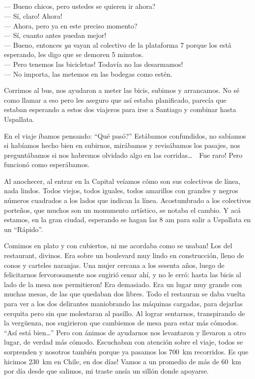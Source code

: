 \subparagraph{}\label{ssub:Valparaiso} --- Bueno chicos, \textquestiondown pero
ustedes se quieren ir ahora? \\ --- \textexclamdown S\'i, claro! \textexclamdown
Ahora! \\ --- \textquestiondown Ahora, pero ya en este preciso momento? \\ ---
\textexclamdown S\'i, cuanto antes puedan mejor! \\ --- Bueno, entonces
\emph{ya} vayan al colectivo de la plataforma 7 porque los est\'a esperando, les
digo que se demoren 5 minutos. \\ --- \textexclamdown Pero tenemos las
bicicletas! \textexclamdown Todav\'ia no las desarmamos! \\ --- No importa, las
metemos en las bodegas como est\'en.\\ \hangindent=1cm

Corrimos al bus, nos ayudaron a meter las bicis, subimos y arrancamos. No s\'e
como llamar a eso pero les aseguro que as\'i estaba planificado, parec\'ia que
estaban esperando a estos dos viajeros para irse a Santiago y combinar hasta
Uspallata.

En el viaje \'ibamos pensando: ``\textquestiondown Qu\'e pas\'o?'' Est\'abamos
confundidos, no sab\'iamos si hab\'iamos hecho bien en subirnos, mir\'abamos y
revis\'abamos los pasajes, nos pregunt\'abamos si nos habremos olvidado algo
en las corridas\ldots\ \ \textexclamdown Fue raro! Pero funcion\'o como
esper\'abamos.

Al anochecer, al entrar en la Capital ve\'iamos c\'omo son sus colectivos de
l\'inea, nada lindos. Todos viejos, todos iguales, todos amarillos con grandes y
negros n\'umeros cuadrados a los lados que indican la l\'inea. Acostumbrado a
los colectivos porte\~nos, que muchos son un monumento art\'istico, se notaba el
cambio. Y ac\'a estamos, en la gran ciudad, esperando se hagan las 8 am para
salir a Uspallata en un ``R\'apido''.

Comimos en plato y con cubiertos, \textexclamdown ni me acordaba como se usaban!
Los del restaurant, divinos. Era sobre un boulevard muy lindo en
construcci\'on, lleno de conos y carteles naranjas. Una mujer cercana a los
sesenta a\~nos, luego de felicitarnos fervorosamente nos sugiri\'o cenar ah\'i,
y no le err\'o: \textexclamdown hasta las bicis al lado de la mesa nos
permitieron! Era demasiado. Era un lugar muy grande con muchas mesas, de las que
quedaban dos libres. Todo el restauran se daba vuelta para ver a los dos
delirantes maniobrando las m\'aquinas cargadas, para dejarlas cerquita pero sin
que molestaran al pasillo. Al lograr sentarnos, transpirando de la verg\"uenza,
nos sugirieron que cambiemos de mesa para estar m\'as c\'omodos. ``As\'i est\'a
bien\ldots'' Pero con \'animos de ayudarnos nos levantaron y llevaron a otro
lugar, de verdad m\'as c\'omodo. Escuchaban con atenci\'on sobre el viaje, todos
se sorprenden y nosotros tambi\'en porque ya pasamos los 700~km recorridos.
\textexclamdown Es que hicimos 230~km en Chile, en dos d\'ias! Vamos a un
promedio de m\'as de 60~km por d\'ia desde que salimos, mi traste ans\'ia un
sill\'on donde apoyarse.

